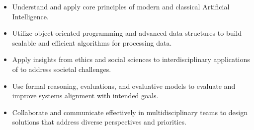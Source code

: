 

\begin{itemize}
        \item Understand and apply core principles of modern and classical Artificial Intelligence.
        \item Utilize object-oriented programming and advanced data structures to build scalable and efficient algorithms for processing data.
        \item Apply insights from ethics and social sciences to interdisciplinary applications of \ai{} to address societal challenges.
        \item Use formal reasoning, evaluations, and evaluative models to evaluate and improve \ai{} systems alignment with intended goals.
        \item Collaborate and communicate effectively in multidisciplinary teams to design \ai{} solutions that address diverse perspectives and priorities.
\end{itemize} 